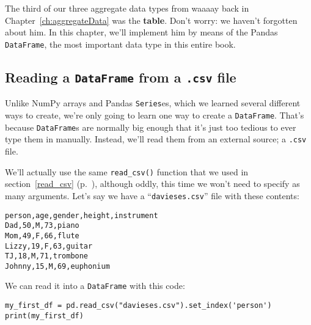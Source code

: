 
\chapter[Tables in Python (1 of 3)]{\huge\selectfont{Tables in Python (1 of
3)}}

\label{tablesInPython1}
\label{dataframes}


The third of our three aggregate data types from waaaay back in
Chapter~\ref{ch:aggregateData} was the \textbf{table}. Don't worry: we haven't
forgotten about him. In this chapter, we'll implement him by means of the
Pandas \texttt{DataFrame}, the most important data type in this entire book.

\section{Reading a \texttt{DataFrame} from a \texttt{.csv} file}


Unlike NumPy arrays and Pandas \texttt{Series}es, which we learned several
different ways to create, we're only going to learn one way to create a
\texttt{DataFrame}. That's because \texttt{DataFrame}s are normally big enough
that it's just too tedious to ever type them in manually. Instead, we'll read
them from an external source; a \texttt{.csv} file.


We'll actually use the same \texttt{read\_csv()} function that we used in
section~\ref{read_csv} (p.~\pageref{read_csv}), although oddly, this time we
won't need to specify as many arguments. Let's say we have a
``\texttt{davieses.csv}'' file with these contents:

\vspace{-.2in}

\begin{Verbatim}[fontsize=\small,samepage=true,frame=lines,framesep=3mm]
person,age,gender,height,instrument
Dad,50,M,73,piano
Mom,49,F,66,flute
Lizzy,19,F,63,guitar
TJ,18,M,71,trombone
Johnny,15,M,69,euphonium
\end{Verbatim}

We can read it into a \texttt{DataFrame} with this code:

\begin{Verbatim}[fontsize=\footnotesize,samepage=true,frame=single,framesep=3mm]
my_first_df = pd.read_csv("davieses.csv").set_index('person')
print(my_first_df)
\end{Verbatim}
\vspace{-.2in}

